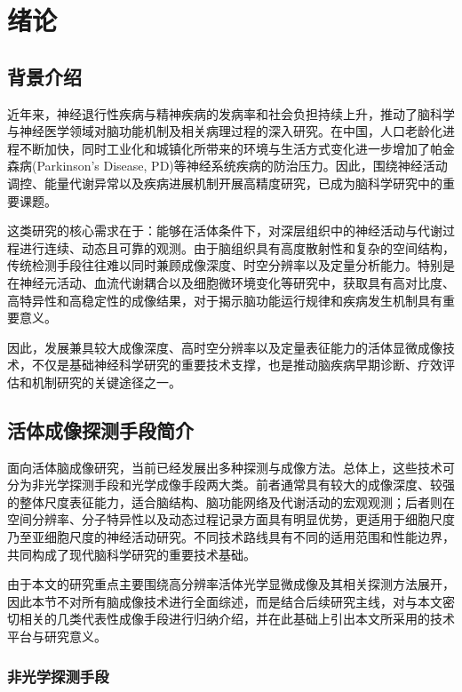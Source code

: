 \chapter{绪论}\label{chap:1}

\section{背景介绍}\label{1.1}

近年来，神经退行性疾病与精神疾病的发病率和社会负担持续上升，推动了脑科学与神经医学领域对脑功能机制及相关病理过程的深入研究\cite{RN2016}。在中国，人口老龄化进程不断加快，同时工业化和城镇化所带来的环境与生活方式变化进一步增加了帕金森病(Parkinson's Disease, PD)等神经系统疾病的防治压力\cite{RN2015}。因此，围绕神经活动调控、能量代谢异常以及疾病进展机制开展高精度研究，已成为脑科学研究中的重要课题。

这类研究的核心需求在于：能够在活体条件下，对深层组织中的神经活动与代谢过程进行连续、动态且可靠的观测。由于脑组织具有高度散射性和复杂的空间结构，传统检测手段往往难以同时兼顾成像深度、时空分辨率以及定量分析能力。特别是在神经元活动、血流代谢耦合以及细胞微环境变化等研究中，获取具有高对比度、高特异性和高稳定性的成像结果，对于揭示脑功能运行规律和疾病发生机制具有重要意义。

因此，发展兼具较大成像深度、高时空分辨率以及定量表征能力的活体显微成像技术，不仅是基础神经科学研究的重要技术支撑，也是推动脑疾病早期诊断、疗效评估和机制研究的关键途径之一。
\section{活体成像探测手段简介}\label{1.2}

面向活体脑成像研究，当前已经发展出多种探测与成像方法。总体上，这些技术可分为非光学探测手段和光学成像手段两大类。前者通常具有较大的成像深度、较强的整体尺度表征能力，适合脑结构、脑功能网络及代谢活动的宏观观测；后者则在空间分辨率、分子特异性以及动态过程记录方面具有明显优势，更适用于细胞尺度乃至亚细胞尺度的神经活动研究。不同技术路线具有不同的适用范围和性能边界，共同构成了现代脑科学研究的重要技术基础。

由于本文的研究重点主要围绕高分辨率活体光学显微成像及其相关探测方法展开，因此本节不对所有脑成像技术进行全面综述，而是结合后续研究主线，对与本文密切相关的几类代表性成像手段进行归纳介绍，并在此基础上引出本文所采用的技术平台与研究意义。

\subsection{非光学探测手段}\label{1.2.1}


